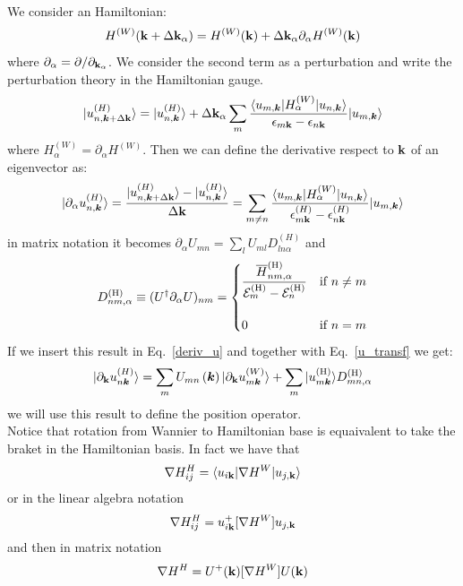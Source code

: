 \documentclass[preprint,showpacs,prb,superscriptaddress,aps,floatfix]{revtex4-1}
\newcommand{\kk}{{\bf k}}
\newcommand{\be}{\begin{equation}}
\newcommand{\ee}{\end{equation}}
\newcommand{\bea}{\begin{eqnarray}}
\newcommand{\eea}{\end{eqnarray}}
\renewcommand{\[}{\left[}
\renewcommand{\]}{\right]}
\renewcommand{\(}{\left(}
\renewcommand{\)}{\right)}
\def\ket#1{\vert#1\rangle}
\def\bra#1{\langle#1\vert}
\def\ph{^{({\rm H})}}
\def\D{{D}\ph}
\begin{document}
We consider an Hamiltonian:
\be
H^{(W)} (\kk + \Delta \kk_\alpha) = H^{(W)} (\kk)  + \Delta \kk_\alpha \partial_\alpha  H^{(W)} (\kk)
\ee
where $\partial_\alpha = \partial/\partial_{\kk_\alpha}$. We consider the second term as a perturbation and write the perturbation theory in the Hamiltonian gauge.
\be
	\ket{ u_{n,\boldsymbol{k}+\Delta \kk}^{\left(H\right)}}=\ket{ u_{n,\boldsymbol{k}}^{\left(H\right)}}+\Delta \kk_\alpha \sum_{m} \frac{\bra{u_{m,\boldsymbol{k} }} H^{(W)}_\alpha   \ket{u_{n,\boldsymbol{k} }}}{\epsilon_{m\kk}-\epsilon_{n\kk}} \ket{u_{m,\boldsymbol{k} }}
\ee
where $ H^{(W)}_\alpha =\partial_\alpha  H^{(W)}$. Then we can define the derivative respect to $\kk$ of an eigenvector as:
\be
\ket{ \partial_\alpha u_{n,\boldsymbol{k}}^{\left(H\right)}}=	\frac{\ket{ u_{n,\boldsymbol{k}+\Delta \kk}^{\left(H\right)}}-\ket{ u_{n,\boldsymbol{k}}^{\left(H\right)}}}{\Delta \kk}= \sum_{m \neq n} \frac{\bra{u_{m,\boldsymbol{k} }} H^{(W)}_\alpha   \ket{u_{n,\boldsymbol{k} }}}{\epsilon^{(H)}_{m\kk}-\epsilon^{(H)}_{n\kk}} \ket{u_{m,\boldsymbol{k} }}
\ee
in matrix notation it becomes $ \partial_\alpha U_{mn} = \sum_l U_{ml} D^{(H)}_{ln\alpha}$ and
\begin{equation}
\D_{nm,\alpha}\equiv (U^{\dagger}
\partial_{\alpha}U)_{nm}=
\begin{cases}
  \displaystyle
  \frac{\overline H_{nm,\alpha}^{(\rm H)}}{{\cal E}^{(\rm H)}_{m}
  -{\cal E}_{n}^{(\rm H)}}& \text{if $n\not= m$}\\ \\
  0& \text{if $n=m$}
\end{cases}
\label{eq:ddef}
\end{equation}
If we insert this result in Eq.~\ref{deriv_u} and together with Eq.~\ref{u_transf} we get:
\begin{equation}
	\ket{ \partial_{\kk} u_{n\boldsymbol{k}}^{\left(H\right)}}=\sum_{m}U_{mn}\left(\boldsymbol{k}\right)\ket{\partial_{\kk} u_{m\boldsymbol{k}}^{\left(W\right)}} + \sum_{m}\ket{u_{m\boldsymbol{k}}\ph} \D_{mn,\alpha}
	\label{deriv_uh}
\end{equation}
we will use this result to define the position operator.\\
Notice that rotation from Wannier to Hamiltonian base is equaivalent to take the braket in the Hamiltonian basis. In fact we have that
\bea
\nabla H^H_{ij} = \langle u_{i\kk} | \nabla   H^W | u_{j,\kk} \rangle
\eea
or in the linear algebra notation
\bea
\nabla H^H_{ij} = u^{+}_{i\kk} [ \nabla   H^W ]  u_{j,\kk}
\eea
and then in matrix notation
\bea
\nabla H^H = U^{+}(\kk) [ \nabla   H^W ]  U(\kk)
\eea
\end{document}
